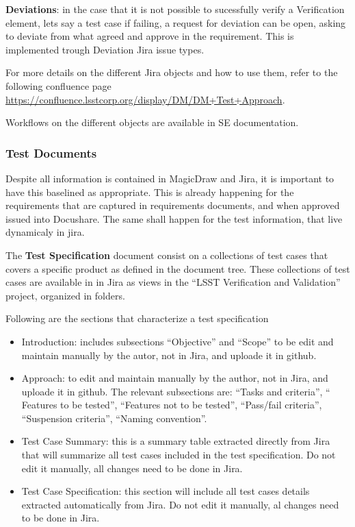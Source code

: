 {\bf Deviations}: in the case that it is not possible to sucessfully verify a Verification element, lets say a test case if failing,  a request for deviation can be open, asking to deviate from what agreed and approve in the requirement. 
This is implemented trough Deviation Jira issue types.

For more details on the different Jira objects and how to use them, refer to the following confluence page 
\url{https://confluence.lsstcorp.org/display/DM/DM+Test+Approach}.

Workflows on the different objects are available in SE documentation.


\subsubsection{Test Documents}

Despite all information is contained in MagicDraw and Jira, it is important to have this baselined as appropriate. This is already happening for the requirements that are captured in requirements documents, and when approved issued into Docushare.
The same shall happen for the test information, that live dynamicaly in jira.

The {\bf Test Specification} document consist on a collections of test cases that covers a specific \product{} product as defined in the document tree. These collections of test cases are available in in Jira as views in the ``LSST Verification and Validation'' project, organized in folders.

Following are the sections that characterize a test specification

\begin{itemize}
\item Introduction: includes subsections ``Objective'' and ``Scope'' to be edit and maintain manually by the autor, not in Jira, and uploade it in github.
\item Approach: to edit and maintain manually by the author, not in Jira, and uploade it in github. The relevant subsections are: ``Tasks and criteria'', `` Features to be tested'', ``Features not to be tested'', ``Pass/fail criteria'', ``Suspension criteria'', ``Naming convention''.
\item Test Case Summary: this is a summary table extracted directly from Jira that will summarize all test cases included in the test specification. Do not edit it manually, all changes need to be done in Jira.
\item Test Case Specification: this section will include all test cases details extracted automatically from Jira. Do not edit it manually, al changes need to be done in Jira.
\end{itemize}

